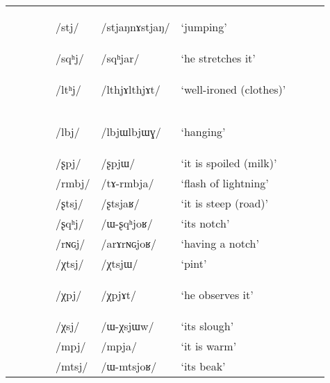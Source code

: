 \documentclass[oneside,a4paper,11pt]{article}
\newcommand{\ipa}[1]{\mbox{\phon/#1/}}
\newcommand{\trois}[1]{\ipa{#1}\addtocounter{3clusters}{1}}
\newcommand{\tib}[1]{\cellcolor{lightgray}\textbf{#1}}
\newcommand{\idph}[1]{\cellcolor{gray}\textbf{#1}}
\newcommand{\resetcounters}[2]{
\newcounter{#1}
\newcounter{#2}
 \setcounter{#1}{\value{2clusters}}
  \setcounter{#2}{\value{3clusters}}
 \setcounter{2clusters}{0}
  \setcounter{3clusters}{0}
}
\begin{document}
\begin{table}
{\begin{tabular}{llllllllll}
 & & & &\trois{stj}  \idph{} &\ipa{stjaŋnɤstjaŋ} & `jumping' \\
 & & & &\trois{sqʰj} &\ipa{sqʰjar} & `he stretches it' \\
\midrule          
 & & & &\trois{ltʰj}  \idph{} &\ipa{lthjɤlthjɤt} & `well-ironed (clothes)' \\
 & & & &\trois{lbj} \idph{} &\ipa{lbjɯlbjɯɣ} & `hanging' \\
\midrule            
 & & & &\trois{ʂpj} &\ipa{ʂpjɯ} & `it is spoiled (milk)' \\
 & & & &\trois{rmbj} &\ipa{tɤ-rmbja} & `flash of lightning' \\
 & & & &\trois{ʂtsj} &\ipa{ʂtsjaʁ} & `it is steep (road)' \\
 & & & &\trois{ʂqʰj} &\ipa{ɯ-ʂqʰjoʁ} & `its notch' \\
 & & & &\trois{rɴɢj} &\ipa{arɤrɴɢjoʁ} & `having a notch' \\
\midrule            
 & & & &\trois{χtsj} &\ipa{χtsjɯ} & `pint' \\
 & & & &\trois{χpj} \tib{} &\ipa{χpjɤt} & `he  observes it' \\
 & & & &\trois{χsj} &\ipa{ɯ-χsjɯw} & `its slough' \\
\midrule            
 & & & &\trois{mpj} &\ipa{mpja} & `it is warm' \\
 & & & &\trois{mtsj} &\ipa{ɯ-mtsjoʁ} & `its beak' \\
\bottomrule
\end{tabular}}
\end{table}
  \resetcounters{2Cjw}{3Cjw} %
   
\end{document}

